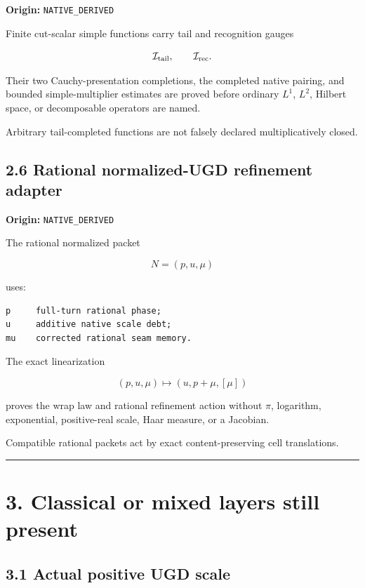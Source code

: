 \textbf{Origin:} \texttt{NATIVE\_DERIVED}

Finite cut-scalar simple functions carry tail and recognition gauges

\[
\mathcal I_{\rm tail},
\qquad
\mathcal I_{\rm rec}.
\]

Their two Cauchy-presentation completions, the completed native pairing, and
bounded simple-multiplier estimates are proved before ordinary \(L^1\),
\(L^2\), Hilbert space, or decomposable operators are named.

Arbitrary tail-completed functions are not falsely declared multiplicatively
closed.

\hypertarget{rational-normalized-ugd-refinement-adapter}{%
\subsection{2.6 Rational normalized-UGD refinement adapter}\label{rational-normalized-ugd-refinement-adapter}}

\textbf{Origin:} \texttt{NATIVE\_DERIVED}

The rational normalized packet

\[
N=(p,u,\mu)
\]

uses:

\begin{verbatim}
p     full-turn rational phase;
u     additive native scale debt;
mu    corrected rational seam memory.
\end{verbatim}

The exact linearization

\[
(p,u,\mu)
\mapsto
(u,p+\mu,[\mu])
\]

proves the wrap law and rational refinement action without \(\pi\), logarithm,
exponential, positive-real scale, Haar measure, or a Jacobian.

Compatible rational packets act by exact content-preserving cell translations.

\begin{center}\rule{0.5\linewidth}{0.5pt}\end{center}

\hypertarget{classical-or-mixed-layers-still-present}{%
\section{3. Classical or mixed layers still present}\label{classical-or-mixed-layers-still-present}}

\hypertarget{actual-positive-ugd-scale}{%
\subsection{3.1 Actual positive UGD scale}\label{actual-positive-ugd-scale}}

